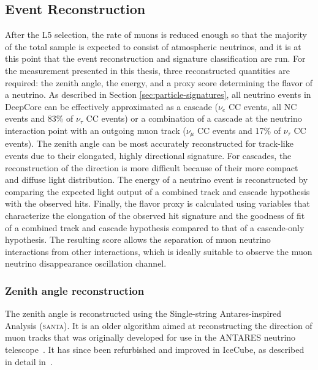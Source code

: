 \subsection{Event Reconstruction}
\label{sec:event-reconstruction}

After the L5 selection, the rate of muons is reduced enough so that the majority of the total sample is expected to consist of atmospheric neutrinos, and it is at this point that the event reconstruction and signature classification are run. For the measurement presented in this thesis, three reconstructed quantities are required: the zenith angle, the energy, and a proxy score determining the flavor of a neutrino. As described in Section \ref{sec:particle-signatures}, all neutrino events in DeepCore can be effectively approximated as a cascade ($\nu_e$ CC events, all NC events and 83\% of $\nu_\tau$ CC events) or a combination of a cascade at the neutrino interaction point with an outgoing muon track ($\nu_\mu$ CC events and 17\% of $\nu_\tau$ CC events). The zenith angle can be most accurately reconstructed for track-like events due to their elongated, highly directional signature. For cascades, the reconstruction of the direction is more difficult because of their more compact and diffuse light distribution. The energy of a neutrino event is reconstructed by comparing the expected light output of a combined track and cascade hypothesis with the observed hits. Finally, the flavor proxy is calculated using variables that characterize the elongation of the observed hit signature and the goodness of fit of a combined track and cascade hypothesis compared to that of a cascade-only hypothesis. The resulting score allows the separation of muon neutrino interactions from other interactions, which is ideally suitable to observe the muon neutrino disappearance oscillation channel.

\subsubsection{Zenith angle reconstruction}
\label{sec:santa}
The zenith angle is reconstructed using the Single-string Antares-inspired Analysis (\textsc{santa}). It is an older algorithm aimed at reconstructing the direction of muon tracks that was originally developed for use in the ANTARES neutrino telescope~. It has since been refurbished and improved in IceCube, as described in detail in~.

